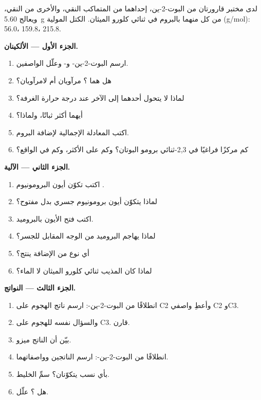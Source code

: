 \begin{problem}
\label{pb:b1:electrophilic-additions:1}
لدى مختبر قارورتان من البوت-2-ين، إحداهما من المتماكب  النقي، والأخرى من
 النقي، ويعالج \qty{5.60}{g} من كل منهما بالبروم في
ثنائي كلورو الميثان. الكتل المولية (\unit{g/mol}):  56.0، 
159.8،  215.8.

\medskip
\noindent\textbf{الجزء الأول --- الألكينان.}
\begin{enumerate}
  \item ارسم البوت-2-ين- و- وعلّل الواصفين.
  \item هل هما ؟ مرآويان أم لامرآويان؟
  \item لماذا لا يتحول أحدهما إلى الآخر عند درجة حرارة الغرفة؟
  \item أيهما أكثر ثباتًا، ولماذا؟
  \item اكتب المعادلة الإجمالية لإضافة البروم.
  \item كم مركزًا فراغيًا في 2,3-ثنائي برومو البوتان؟ وكم 
        على الأكثر، وكم في الواقع؟
\end{enumerate}

\medskip
\noindent\textbf{الجزء الثاني --- الآلية.}
\begin{enumerate}[resume]
  \item اكتب تكوّن أيون البرومونيوم .
  \item لماذا يتكوّن أيون برومونيوم جسري بدل 
        مفتوح؟
  \item اكتب فتح الأيون بالبروميد.
  \item لماذا يهاجم البروميد من الوجه المقابل للجسر؟
  \item أي نوع من الإضافة ينتج؟
  \item لماذا كان المذيب ثنائي كلورو الميثان لا الماء؟
\end{enumerate}

\medskip
\noindent\textbf{الجزء الثالث --- النواتج.}
\begin{enumerate}[resume]
  \item انطلاقًا من البوت-2-ين-: ارسم ناتج الهجوم على C2 وأعطِ
        واصفي C2 وC3.
  \item والسؤال نفسه للهجوم على C3. قارن.
  \item بيّن أن الناتج ميزو.
  \item انطلاقًا من البوت-2-ين-: ارسم الناتجين
        وواصفاتهما.
  \item بأي نسب يتكوّنان؟ سمِّ الخليط.
  \item هل ؟ علّل.
\end{enumerate}


\end{problem}
